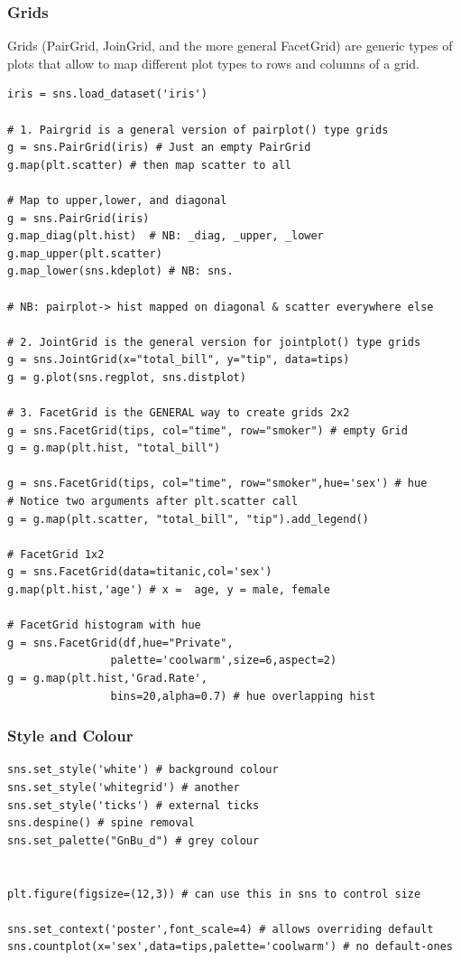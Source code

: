 \documentclass[12pt]{article}
\begin{document}
\subsubsection{Grids}
Grids (PairGrid, JoinGrid, and the more general FacetGrid) are generic types of plots that allow to map different plot types to rows and columns of a grid.
\begin{lstlisting}
iris = sns.load_dataset('iris')

# 1. Pairgrid is a general version of pairplot() type grids
g = sns.PairGrid(iris) # Just an empty PairGrid
g.map(plt.scatter) # then map scatter to all

# Map to upper,lower, and diagonal
g = sns.PairGrid(iris)
g.map_diag(plt.hist)  # NB: _diag, _upper, _lower
g.map_upper(plt.scatter)
g.map_lower(sns.kdeplot) # NB: sns. 

# NB: pairplot-> hist mapped on diagonal & scatter everywhere else

# 2. JointGrid is the general version for jointplot() type grids
g = sns.JointGrid(x="total_bill", y="tip", data=tips)
g = g.plot(sns.regplot, sns.distplot)

# 3. FacetGrid is the GENERAL way to create grids 2x2
g = sns.FacetGrid(tips, col="time", row="smoker") # empty Grid
g = g.map(plt.hist, "total_bill")

g = sns.FacetGrid(tips, col="time", row="smoker",hue='sex') # hue
# Notice two arguments after plt.scatter call
g = g.map(plt.scatter, "total_bill", "tip").add_legend()

# FacetGrid 1x2
g = sns.FacetGrid(data=titanic,col='sex')
g.map(plt.hist,'age') # x =  age, y = male, female

# FacetGrid histogram with hue
g = sns.FacetGrid(df,hue="Private",
				palette='coolwarm',size=6,aspect=2)
g = g.map(plt.hist,'Grad.Rate',
				bins=20,alpha=0.7) # hue overlapping hist
\end{lstlisting}

\subsubsection{Style and Colour}
\begin{lstlisting}
sns.set_style('white') # background colour
sns.set_style('whitegrid') # another
sns.set_style('ticks') # external ticks
sns.despine() # spine removal
sns.set_palette("GnBu_d") # grey colour


plt.figure(figsize=(12,3)) # can use this in sns to control size

sns.set_context('poster',font_scale=4) # allows overriding default
sns.countplot(x='sex',data=tips,palette='coolwarm') # no default-ones
\end{lstlisting}
\end{document}
